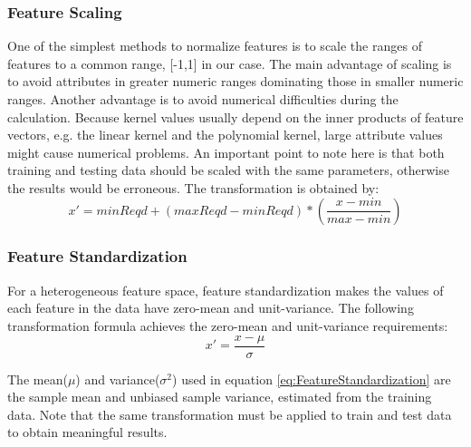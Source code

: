 \subsubsection{Feature Scaling}
One of the simplest methods to normalize features is to scale the ranges of features to a common range, [-1,1] in our case. The main advantage of scaling is to avoid attributes in greater numeric ranges dominating those in smaller numeric ranges. Another advantage is to avoid numerical difficulties during the calculation. Because kernel values usually depend on the inner products of feature vectors, e.g. the linear kernel and the polynomial kernel, large attribute values might cause numerical problems. An important point to note here is that both training and testing data should be scaled with the same parameters, otherwise the results would be erroneous.
The transformation is obtained by:
\begin{equation}
\label{eq:FeatureScaling}
x' = minReqd + (maxReqd-minReqd)*\left(\frac{x-min}{max-min}\right)
\end{equation}

\subsubsection{Feature Standardization}
For a heterogeneous feature space, feature standardization makes the values of each feature in the data have zero-mean and unit-variance. The following transformation formula achieves the zero-mean and unit-variance requirements:
\begin{equation}
\label{eq:FeatureStandardization}
x' = \frac{x-\mu}{\sigma}
\end{equation}

The mean($\mu$) and variance($\sigma^2$) used in equation \ref{eq:FeatureStandardization} are the sample mean and unbiased sample variance, estimated from the training data. Note that the same transformation must be applied to train and test data to obtain meaningful results.

